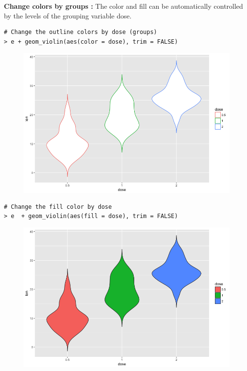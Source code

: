 \textbf{Change colors by groups : } The color and fill can be automatically controlled by the levels  of the grouping variable dose. 
\begin{lstlisting}[language=html]
# Change the outline colors by dose (groups)
> e + geom_violin(aes(color = dose), trim = FALSE)
\end{lstlisting}
\begin{figure}[H]\begin{center}\includegraphics[scale=1 ]{ilu/bg95.png}\end{center}\end{figure}
\begin{lstlisting}[language=html]
# Change the fill color by dose
> e  + geom_violin(aes(fill = dose), trim = FALSE)
\end{lstlisting}
\begin{figure}[H]\begin{center}\includegraphics[scale=1 ]{ilu/bg96.png}\end{center}\end{figure}
